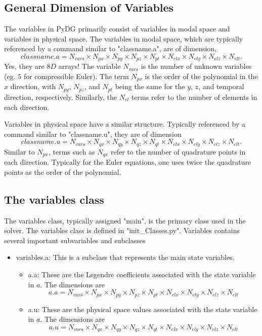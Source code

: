 \documentclass[times,12pt]{article}%
\begin{document}
\subsection{General Dimension of Variables}
The variables in PyDG primarily consist of variables in modal space and variables in physical space. The variables in modal space, which are typically referenced by a command similar to "classname.a", are of dimension,
$$classname.a = N_{vars} \times N_{px} \times N_{py}  \times N_{pz}  \times N_{pt} \times N_{elx} \times N_{ely}  \times N_{elz}  \times N_{elt}.$$
Yes, they are $8D$ arrays! The variable $N_{vars}$ is the number of unknown variables (eg. $5$ for compressible Euler). The term $N_{px}$ is the order of the polynomial in the $x$ direction, with $N_{py}$, $N_{pz}$, and $N_{pt}$ being the same for the $y$, $z$, and temporal direction, respectively. Similarly, the $N_{el}$ terms refer to the number of elements in each direction. 

Variables in physical space have a similar structure. Typically referenced by a command similar to "classname.u", they are of dimension
$$classname.u = N_{vars} \times N_{qx} \times N_{qy}  \times N_{qz}  \times N_{qt} \times N_{elx} \times N_{ely}  \times N_{elz}  \times N_{elt}.$$
Similar to $N_{px}$, terms such as $N_{qx}$ refer to the number of quadrature points in each direction. Typically for the Euler equations, one uses twice the quadrature points as the order of the polynomial.

\subsection{The variables class}
The variables class, typically assigned "main", is the primary class used in the solver. The variables class is defined in "init\_Classes.py". Variables contains several important subvariables and subclasses
\begin{itemize}
\item variables.a: This is a subclass that represents the main state variables. 
\begin{itemize}
\item a.a: These are the Legendre coefficients associated with the state variable in $a$. The dimensions are 
$$a.a = N_{vars} \times N_{px} \times N_{py}  \times N_{pz}  \times N_{pt} \times N_{elx} \times N_{ely}  \times N_{elz}  \times N_{elt} $$
\item a.u: These are the physical space values associated with the state variable in $a$. The dimensions are 
$$a.u = N_{vars} \times N_{qx} \times N_{qy}  \times N_{qz}  \times N_{qt} \times N_{elx} \times N_{ely}  \times N_{elz}  \times N_{elt} $$
\end{itemize}

\end{itemize}
\end{document}
